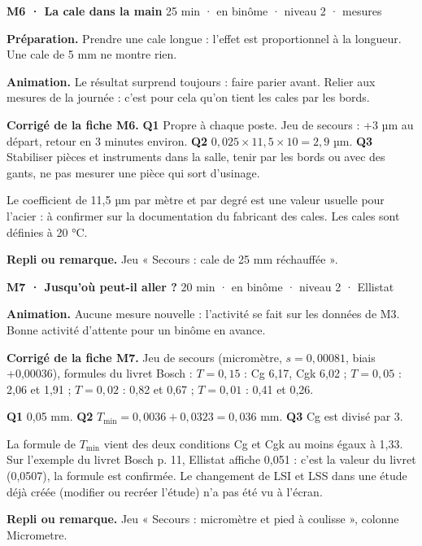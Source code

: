 \begin{tcolorbox}[act]\textbf{M6 · La cale dans la main} \hfill {\small 25 min · en binôme · niveau 2 · mesures}\end{tcolorbox}
\textbf{Préparation.} Prendre une cale longue : l'effet est proportionnel à la longueur. Une cale de 5 mm ne montre rien.\par
\textbf{Animation.} Le résultat surprend toujours : faire parier avant. Relier aux mesures de la journée : c'est pour cela qu'on tient les cales par les bords.\par
\textbf{\color{ok}Corrigé de la fiche M6.} \textbf{Q1} Propre à chaque poste. Jeu de secours : +3 µm au départ, retour en 3 minutes environ. \textbf{Q2} $0{,}025 \times 11{,}5 \times 10 = 2{,}9$ µm. \textbf{Q3} Stabiliser pièces et instruments dans la salle, tenir par les bords ou avec des gants, ne pas mesurer une pièce qui sort d'usinage.\par Le coefficient de 11,5 µm par mètre et par degré est une valeur usuelle pour l'acier : à confirmer sur la documentation du fabricant des cales. Les cales sont définies à 20 °C.\par
{\small\textbf{Repli ou remarque.} Jeu « Secours : cale de 25 mm réchauffée ».}\par
\vspace{3pt}
\begin{tcolorbox}[act]\textbf{M7 · Jusqu'où peut-il aller ?} \hfill {\small 20 min · en binôme · niveau 2 · Ellistat}\end{tcolorbox}
\textbf{Animation.} Aucune mesure nouvelle : l'activité se fait sur les données de M3. Bonne activité d'attente pour un binôme en avance.\par
\textbf{\color{ok}Corrigé de la fiche M7.} Jeu de secours (micromètre, $s = 0{,}00081$, biais +0,00036), formules du livret Bosch : $T = 0{,}15$ : Cg 6,17, Cgk 6,02 ; $T = 0{,}05$ : 2,06 et 1,91 ; $T = 0{,}02$ : 0,82 et 0,67 ; $T = 0{,}01$ : 0,41 et 0,26.\par \textbf{Q1} 0,05 mm. \textbf{Q2} $T_{\min} = 0{,}0036 + 0{,}0323 = 0{,}036$ mm. \textbf{Q3} Cg est divisé par 3.\par La formule de $T_{\min}$ vient des deux conditions Cg et Cgk au moins égaux à 1,33. Sur l'exemple du livret Bosch p. 11, Ellistat affiche 0,051 : c'est la valeur du livret (0,0507), la formule est confirmée. Le changement de LSI et LSS dans une étude déjà créée (modifier ou recréer l'étude) n'a pas été vu à l'écran.\par
{\small\textbf{Repli ou remarque.} Jeu « Secours : micromètre et pied à coulisse », colonne Micrometre.}\par
